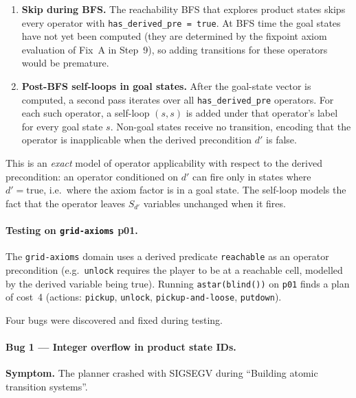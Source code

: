 \documentclass[11pt,a4paper]{article}
\begin{document}
\begin{itemize}
\begin{enumerate}
      \item \textbf{Skip during BFS.}
        The reachability BFS that explores product states skips every operator
        with \texttt{has\_derived\_pre = true}.  At BFS time the goal states
        have not yet been computed (they are determined by the fixpoint axiom
        evaluation of Fix~A in Step~9), so adding transitions for these
        operators would be premature.

      \item \textbf{Post-BFS self-loops in goal states.}
        After the goal-state vector is computed, a second pass iterates over
        all \texttt{has\_derived\_pre} operators.  For each such operator, a
        self-loop $(s, s)$ is added under that operator's label for every goal
        state $s$.  Non-goal states receive no transition, encoding that the
        operator is inapplicable when the derived precondition $d'$ is false.
    \end{enumerate}

    This is an \emph{exact} model of operator applicability with respect to
    the derived precondition: an operator conditioned on $d'$ can fire only in
    states where $d' = \mathrm{true}$, i.e.\ where the axiom factor is in a
    goal state.  The self-loop models the fact that the operator leaves $S_{d'}$
    variables unchanged when it fires.

    \paragraph{Testing on \texttt{grid-axioms} p01.}

    The \texttt{grid-axioms} domain uses a derived predicate \texttt{reachable}
    as an operator precondition (e.g.\ \texttt{unlock} requires the player to be
    at a reachable cell, modelled by the derived variable being true).  Running
    \texttt{astar(blind())} on \texttt{p01} finds a plan of cost~4 (actions:
    \texttt{pickup}, \texttt{unlock}, \texttt{pickup-and-loose}, \texttt{putdown}).

    Four bugs were discovered and fixed during testing.

    \paragraph{Bug 1 --- Integer overflow in product state IDs.}
    \textbf{Symptom.}  The planner crashed with SIGSEGV during
    ``Building atomic transition systems''.


\end{itemize}
\end{document}
